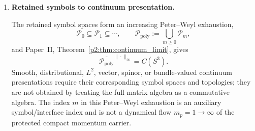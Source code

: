 \documentclass[12pt,a4paper]{article}
\begin{document}
\begin{theorem}
\begin{enumerate}[label=(\roman*), leftmargin=2.3em]
\[\subseteq\End(\mathcal H_m^{\rm sc}) .
\]
The canonical retained-symbol readout on this Toeplitz image is
\begin{equation}
\label{p4:eq:three-map-symbol-readout}
\sigma_m^{\rm sc}:\mathcal T_m^{\rm sc}\longrightarrow
\mathcal P_m\cap(\ker\mathsf T_m^{\rm sc})^\perp,
\qquad
\sigma_m^{\rm sc}(\mathsf T_m^{\rm sc} f)=f_\perp ,
\end{equation}
where \(f=f_0+f_\perp\),
\(f_0\in\ker\mathsf T_m^{\rm sc}\), and
\(f_\perp\perp\ker\mathsf T_m^{\rm sc}\).
Thus a finite operator has classical scalar symbol content only after it lies in the Toeplitz image, or after an additional covariant-symbol/interface readout has been explicitly supplied.
There is no structural identification \(\End(\mathcal H_m)\subset C(S^3)\).

\item \textbf{Retained symbols to continuum presentation.}\par
The retained symbol spaces form an increasing Peter--Weyl exhaustion,
\begin{equation}
\label{p4:eq:three-map-pw-exhaustion}
\mathcal P_0\subseteq\mathcal P_1\subseteq\cdots,
\qquad
\mathcal P_{\mathrm{poly}}:=\bigcup_{m\ge0}\mathcal P_m,
\end{equation}
and Paper~II, Theorem~\ref{p2:thm:continuum_limit}, gives
\begin{equation}
\label{p4:eq:three-map-continuum-density}
\overline{\mathcal P_{\mathrm{poly}}}^{\|\cdot\|_\infty}=C(S^3).
\end{equation}
Smooth, distributional, \(L^2\), vector, spinor, or bundle-valued continuum
presentations require their corresponding symbol spaces and topologies; they
are not obtained by treating the full matrix algebra as a commutative algebra.
The index \(m\) in this Peter--Weyl exhaustion is an auxiliary
symbol/interface index and is not a dynamical flow \(m_p=1\to\infty\) of the
protected compact momentum carrier.


\end{enumerate}
\end{theorem}
\end{document}
